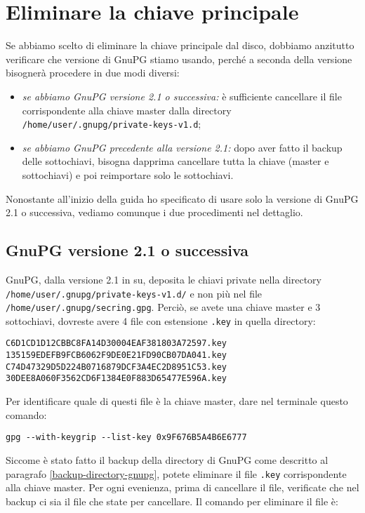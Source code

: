 \section{Eliminare la chiave principale}

Se abbiamo scelto di eliminare la chiave principale dal disco, dobbiamo
anzitutto verificare che versione di GnuPG stiamo usando, perché a seconda della
versione bisognerà procedere in due modi diversi:

\begin{itemize}
   \item \emph{se abbiamo GnuPG versione 2.1 o successiva:} è sufficiente
   cancellare il file corrispondente alla chiave master dalla directory
   \texttt{/home/user/.gnupg/private-keys-v1.d};
   \item \emph{se abbiamo GnuPG precedente alla versione 2.1:} dopo aver fatto
   il backup delle sottochiavi, bisogna dapprima cancellare tutta la chiave
   (master e sottochiavi) e poi reimportare solo le sottochiavi.
\end{itemize}

Nonostante all'inizio della guida ho specificato di usare solo la versione di
GnuPG 2.1 o successiva, vediamo comunque i due procedimenti nel dettaglio.

\subsection{GnuPG versione 2.1 o successiva}

GnuPG, dalla versione 2.1 in su, deposita le chiavi private nella directory
\texttt{/home/user/.gnupg/private-keys-v1.d/} e non più nel file
\texttt{/home/user/.gnupg/secring.gpg}. Perciò, se avete una chiave master e 3
sottochiavi, dovreste avere 4 file con estensione \texttt{.key} in quella
directory:

\begin{lstlisting}
C6D1CD1D12CBBC8FA14D30004EAF381803A72597.key
135159EDEFB9FCB6062F9DE0E21FD90CB07DA041.key
C74D47329D5D224B0716879DCF3A4EC2D8951C53.key
30DEE8A060F3562CD6F1384E0F883D65477E596A.key
\end{lstlisting}

Per identificare quale di questi file è la chiave master, dare nel terminale
questo comando:

\begin{lstlisting}
gpg --with-keygrip --list-key 0x9F676B5A4B6E6777
\end{lstlisting}

Siccome è stato fatto il backup della directory di GnuPG come descritto al
paragrafo \vref{backup-directory-gnupg}, potete eliminare il file \texttt{.key}
corrispondente alla chiave master. Per ogni evenienza, prima di cancellare il
file, verificate che nel backup ci sia il file che state per cancellare. Il
comando per eliminare il file è:


